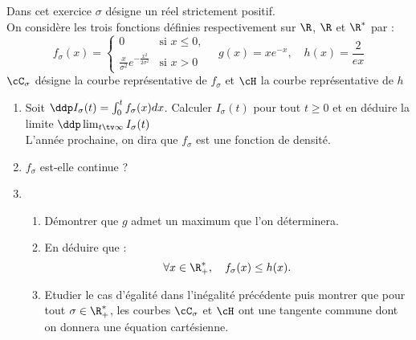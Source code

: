 



\begin{exercice}[G2E 2019]
Dans cet exercice $\sigma$ désigne un réel strictement positif. \\

On considère les trois fonctions définies respectivement sur $\R$, $\R$ et $\R^*$ par :
$$
f_\sigma (x) = \left\{\begin{array}{lr}
0 & \text{si $x\leq 0,$}\\
\frac{x}{\sigma^2}e^{-\frac{x^2}{2\sigma^2}} &\text{si $x> 0$}
\end{array}\right. \quad g(x) =xe^{-x}, \quad h(x) = \frac{2}{ex}
$$
$\cC_\sigma$ désigne la courbe représentative de $f_\sigma$ et $\cH$ la courbe représentative de $h$
\begin{enumerate}
\item Soit $\ddp I_\sigma(t) = \int_0^t f_\sigma(x) dx$. Calculer $I_\sigma(t) $ pour tout $t\geq 0$ et en déduire la limite $\ddp \lim_{t\tv \infty} I_\sigma(t) $ \\
{\footnotesize L'année prochaine, on dira que $f_\sigma$ est une fonction de densité.}
\item $f_\sigma$ est-elle continue ? 
\item \begin{enumerate}
\item Démontrer que $g$ admet un maximum que l'on déterminera. 
\item En déduire que :
$$\forall x\in \R_+^*, \quad f_\sigma (x) \leq h(x).$$
\item Etudier le cas d'égalité dans l'inégalité précédente puis montrer que pour tout $\sigma \in \R^*_+$, les courbes $\cC_\sigma$ et $\cH$ ont une tangente commune dont on donnera une équation cartésienne. 
\end{enumerate}
\end{enumerate}

\end{exercice}

